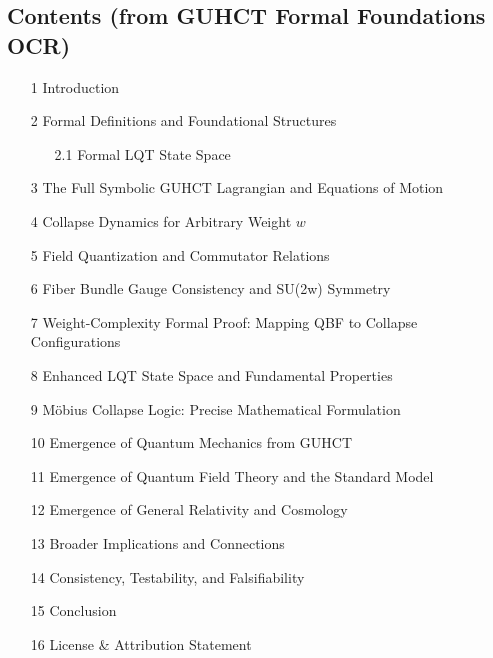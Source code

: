 \documentclass[11pt,a4paper]{article}
\begin{document}
\subsection*{Contents (from GUHCT Formal Foundations OCR)}
\begin{itemize}
    \item[1] Introduction 
    \item[2] Formal Definitions and Foundational Structures 
    \begin{itemize}
        \item[2.1] Formal LQT State Space 
    \end{itemize}
    \item[3] The Full Symbolic GUHCT Lagrangian and Equations of Motion 
    \item[4] Collapse Dynamics for Arbitrary Weight $w$ 
    \item[5] Field Quantization and Commutator Relations 
    \item[6] Fiber Bundle Gauge Consistency and SU(2w) Symmetry 
    \item[7] Weight-Complexity Formal Proof: Mapping QBF to Collapse Configurations 
    \item[8] Enhanced LQT State Space and Fundamental Properties 
    \item[9] M\"obius Collapse Logic: Precise Mathematical Formulation 
    \item[10] Emergence of Quantum Mechanics from GUHCT 
    \item[11] Emergence of Quantum Field Theory and the Standard Model 
    \item[12] Emergence of General Relativity and Cosmology 
    \item[13] Broader Implications and Connections 
    \item[14] Consistency, Testability, and Falsifiability 
    \item[15] Conclusion 
    \item[16] License \& Attribution Statement 
\end{itemize}
\end{document}

